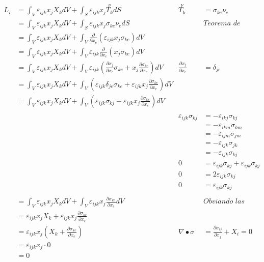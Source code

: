 \documentclass[a4paper,10pt,twoside,final,spanish]{article}
\begin{document}
\begin{align*}
L_{i} &= \int_{V}\varepsilon_{ijk}x_{j}X_{k}dV
+\int_{S}\varepsilon_{ijk}x_{j}\stackrel{\nu}{T_{k}}dS
& \stackrel{\nu}{T_{k}} &= \sigma_{ke}\nu_{e} \\
&= \int_{V}\varepsilon_{ijk}x_{j}X_{k}dV
+\int_{S}\varepsilon_{ijk}x_{j}\sigma_{ke}\nu_{e}dS
&& \textit{Teorema de Gauss} \\
&= \int_{V}\varepsilon_{ijk}x_{j}X_{k}dV
+\int_{V}\frac{\partial}{\partial x_{e}}(\varepsilon_{ijk}x_{j}\sigma_{ke})dV \\
&= \int_{V}\varepsilon_{ijk}x_{j}X_{k}dV
+\int_{V}\varepsilon_{ijk}\frac{\partial}{\partial x_{e}}(x_{j}\sigma_{ke})dV \\
&= \int_{V}\varepsilon_{ijk}x_{j}X_{k}dV
+\int_{V}\varepsilon_{ijk}\left(\frac{\partial x_{j}}{\partial x_{e}}\sigma_{ke}
+x_{j}\frac{\partial\sigma_{ke}}{\partial x_{e}}\right)dV
& \frac{\partial x_{j}}{\partial x_{e}} &= \delta_{je} \\
&= \int_{V}\varepsilon_{ijk}x_{j}X_{k}dV
+\int_{V}\left(\varepsilon_{ijk}\delta_{je}\sigma_{ke}
+\varepsilon_{ijk}x_{j}\frac{\partial\sigma_{ke}}{\partial x_{e}}\right)dV \\
&= \int_{V}\varepsilon_{ijk}x_{j}X_{k}dV
+\int_{V}\left(\varepsilon_{ijk}\sigma_{kj}
+\varepsilon_{ijk}x_{j}\frac{\partial\sigma_{ke}}{\partial x_{e}}\right)dV \\ \\
&& \varepsilon_{ijk}\sigma_{kj} &= -\varepsilon_{ikj}\sigma_{kj} \\
&& &= -\varepsilon_{ikm}\sigma_{km} \\
&& &= -\varepsilon_{ijm}\sigma_{jm} \\
&& &= -\varepsilon_{ijk}\sigma_{jk} \\
&& &= -\varepsilon_{ijk}\sigma_{kj} \\
&& 0 &= \varepsilon_{ijk}\sigma_{kj}+\varepsilon_{ijk}\sigma_{kj} \\
&& 0 &= 2\varepsilon_{ijk}\sigma_{kj} \\
&& 0 &= \varepsilon_{ijk}\sigma_{kj} \\ \\
&= \int_{V}\varepsilon_{ijk}x_{j}X_{k}dV
+\int_{V}\varepsilon_{ijk}x_{j}\frac{\partial\sigma_{ke}}{\partial x_{e}}dV
&& \textit{Obviando las integrales} \\
&= \varepsilon_{ijk}x_{j}X_{k}
+\varepsilon_{ijk}x_{j}\frac{\partial\sigma_{ke}}{\partial x_{e}} \\
&= \varepsilon_{ijk}x_{j}\left(X_{k}+\frac{\partial\sigma_{ke}}{\partial x_{e}}\right)
& \nabla\bullet\sigma &= \frac{\partial\sigma_{ij}}{\partial x_{j}}+X_{i}=0 \\
&= \varepsilon_{ijk}x_{j}\cdot 0 \\
&= 0
\end{align*}
\end{document}
